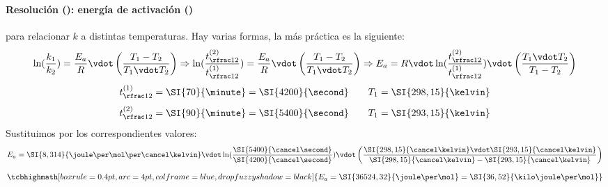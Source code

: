 \begin{frame}
	\frametitle{\ejerciciocmd}
	\framesubtitle{Resolución (): energía de activación ()}
	 para relacionar $k$ a distintas temperaturas. Hay varias formas, la más práctica es la siguiente:
	$$
		\ln(\frac{k_1}{k_2}) = \frac{E_a}{R}\vdot\left(\frac{T_1-T_2}{T_1\vdot T_2}\right)\Rightarrow
		\ln(\frac{\tmed{2}}{\tmed{1}}) = \frac{E_a}{R}\vdot\left(\frac{T_1-T_2}{T_1\vdot T_2}\right)\Rightarrow
		E_a = R\vdot\ln(\frac{\tmed{2}}{\tmed{1}})\vdot\left(\frac{T_1\vdot T_2}{T_1-T_2}\right)
	$$
	$$
		\tmed{1} = \SI{70}{\minute} = \SI{4200}{\second}\qquad T_1 = \SI{298,15}{\kelvin}
	$$
	$$
		\tmed{2} = \SI{90}{\minute} = \SI{5400}{\second}\qquad T_1 = \SI{293,15}{\kelvin}
	$$
	Sustituimos por los correspondientes valores:
	$$
		E_a = \SI{8,314}{\joule\per\mol\per\cancel\kelvin}\vdot\ln(\frac{\SI{5400}{\cancel\second}}{\SI{4200}{\cancel\second}})\vdot\left(\frac{\SI{298,15}{\cancel\kelvin}\vdot\SI{293,15}{\cancel\kelvin}}{\SI{298,15}{\cancel\kelvin}-\SI{293,15}{\cancel\kelvin}}\right)
	$$
	$$
		\tcbhighmath[boxrule=0.4pt,arc=4pt,colframe=blue,drop fuzzy shadow=black]{E_a = \SI{36524,32}{\joule\per\mol} = \SI{36,52}{\kilo\joule\per\mol}}
	$$
\end{frame}